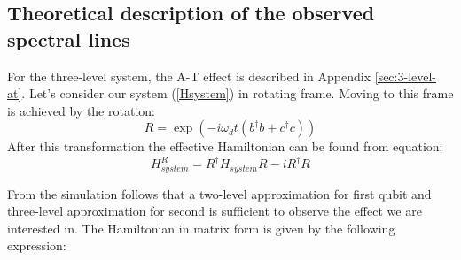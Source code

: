 \documentclass[%
 aip,
 amsmath,amssymb,
 reprint,%
]{revtex4-1}
\begin{document}
\subsection{Theoretical description of the observed spectral lines}
For the three-level system, the A-T effect is described in Appendix \ref{sec:3-level-at}. Let's consider our system (\autoref{Hsystem}) in rotating frame. Moving to this frame is achieved by the rotation:
\begin{equation}
R = \exp(-i\omega_d t (b^{\dagger}b+c^{\dagger}c))
\end{equation}  
After this transformation the effective Hamiltonian can be found from equation:
\begin{equation}
H_{system}^R = R^{\dagger}H_{system}R-iR^{\dagger}\dot{R}
\end{equation}

From the simulation follows that a two-level approximation for first qubit and three-level approximation for second is sufficient to observe the effect we are interested in. The Hamiltonian in matrix form is given by the following expression:
\end{document}
